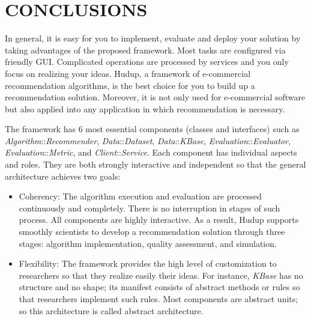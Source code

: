 \documentclass[a4paper,twoside]{article}
\begin{document}
\section{\uppercase{Conclusions}}
\label{sec:conclusions}
In general, it is easy for you to implement, evaluate and deploy your solution by taking advantages of the proposed framework. Most tasks are configured via friendly GUI. Complicated operations are processed by services and you only focus on realizing your ideas. Hudup, a framework of e-commercial recommendation algorithms, is the best choice for you to build up a recommendation solution. Moreover, it is not only used for e-commercial software but also applied into any application in which recommendation is necessary.

The framework has 6 most essential components (classes and interfaces) such as \textit{Algorithm}::\textit{Recommender}, \textit{Data}::\textit{Dataset}, \textit{Data}::\textit{KBase}, \textit{Evaluation}::\textit{Evaluator}, \textit{Evaluation}::\textit{Metric}, and \textit{Client}::\textit{Service}. Each component has individual aspects and roles. They are both strongly interactive and independent so that the general architecture achieves two goals:
\begin{itemize}
\item Coherency: The algorithm execution and evaluation are processed continuously and completely. There is no interruption in stages of such process. All components are highly interactive. As a result, Hudup supports smoothly scientists to develop a recommendation solution through three stages: algorithm implementation, quality assessment, and simulation.
\item Flexibility: The framework provides the high level of customization to researchers so that they realize easily their ideas. For instance, \textit{KBase} has no structure and no shape; its manifest consists of abstract methods or rules so that researchers implement such rules. Most components are abstract units; so this architecture is called abstract architecture.
\end{itemize}
\end{document}
